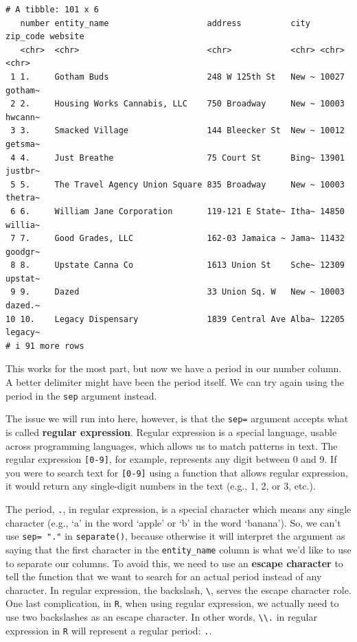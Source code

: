 \documentclass[
  letterpaper,
]{book}
\begin{document}
\begin{verbatim}
# A tibble: 101 x 6
   number entity_name                    address          city  zip_code website
   <chr>  <chr>                          <chr>            <chr> <chr>    <chr>  
 1 1.     Gotham Buds                    248 W 125th St   New ~ 10027    gotham~
 2 2.     Housing Works Cannabis, LLC    750 Broadway     New ~ 10003    hwcann~
 3 3.     Smacked Village                144 Bleecker St  New ~ 10012    getsma~
 4 4.     Just Breathe                   75 Court St      Bing~ 13901    justbr~
 5 5.     The Travel Agency Union Square 835 Broadway     New ~ 10003    thetra~
 6 6.     William Jane Corporation       119-121 E State~ Itha~ 14850    willia~
 7 7.     Good Grades, LLC               162-03 Jamaica ~ Jama~ 11432    goodgr~
 8 8.     Upstate Canna Co               1613 Union St    Sche~ 12309    upstat~
 9 9.     Dazed                          33 Union Sq. W   New ~ 10003    dazed.~
10 10.    Legacy Dispensary              1839 Central Ave Alba~ 12205    legacy~
# i 91 more rows
\end{verbatim}

This works for the most part, but now we have a period in our number
column. A better delimiter might have been the period itself. We can try
again using the period in the \texttt{sep} argument instead.

The issue we will run into here, however, is that the \texttt{sep=}
argument accepts what is called \textbf{regular expression}. Regular
expression is a special language, usable across programming languages,
which allows us to match patterns in text. The regular expression
\texttt{{[}0-9{]}}, for example, represents any digit between 0 and 9.
If you were to search text for \texttt{{[}0-9{]}} using a function that
allows regular expression, it would return any single-digit numbers in
the text (e.g., 1, 2, or 3, etc.).

The period, \texttt{.}, in regular expression, is a special character
which means any single character (e.g., `a' in the word `apple' or `b'
in the word `banana'). So, we can't use \texttt{sep=\ "."} in
\texttt{separate()}, because otherwise it will interpret the argument as
saying that the first character in the \texttt{entity\_name} column is
what we'd like to use to separate our columns. To avoid this, we need to
use an \textbf{escape character} to tell the function that we want to
search for an actual period instead of any character. In regular
expression, the backslash, \texttt{\textbackslash{}}, serves the escape
character role. One last complication, in \texttt{R}, when using regular
expression, we actually need to use two backslashes as an escape
character. In other words, \texttt{\textbackslash{}\textbackslash{}.} in
regular expression in \texttt{R} will represent a regular period:
\texttt{.}.
\end{document}
